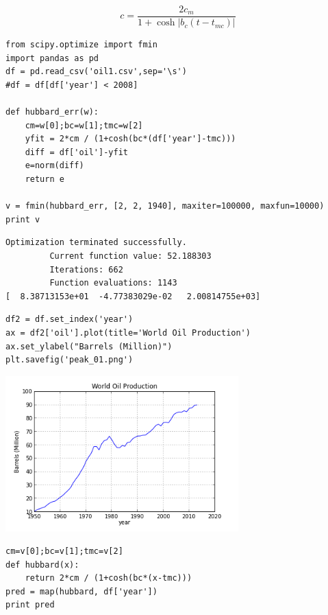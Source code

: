 \documentclass[12pt,fleqn]{article}\usepackage{../common}
\begin{document}
$$ 
c = \frac{ 2c_m}{1 + \cosh |b_c(t-t_{mc})|   }
$$


\begin{verbatim}
from scipy.optimize import fmin
import pandas as pd
df = pd.read_csv('oil1.csv',sep='\s')
#df = df[df['year'] < 2008]

def hubbard_err(w):
    cm=w[0];bc=w[1];tmc=w[2]
    yfit = 2*cm / (1+cosh(bc*(df['year']-tmc)))
    diff = df['oil']-yfit
    e=norm(diff)
    return e

v = fmin(hubbard_err, [2, 2, 1940], maxiter=100000, maxfun=10000)
print v
\end{verbatim}

\begin{verbatim}
Optimization terminated successfully.
         Current function value: 52.188303
         Iterations: 662
         Function evaluations: 1143
[  8.38713153e+01  -4.77383029e-02   2.00814755e+03]
\end{verbatim}

\begin{verbatim}
df2 = df.set_index('year')
ax = df2['oil'].plot(title='World Oil Production')
ax.set_ylabel("Barrels (Million)")
plt.savefig('peak_01.png')
\end{verbatim}


\includegraphics[height=6cm]{peak_01.png}

\begin{verbatim}
cm=v[0];bc=v[1];tmc=v[2]
def hubbard(x): 
    return 2*cm / (1+cosh(bc*(x-tmc)))
pred = map(hubbard, df['year'])
print pred
\end{verbatim}
\end{document}

